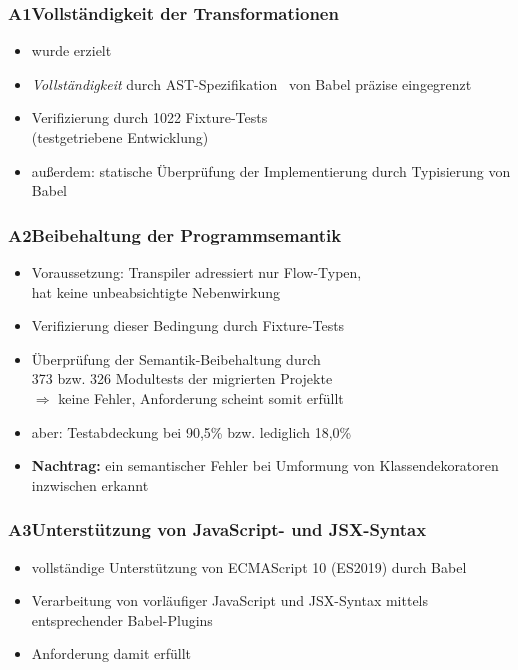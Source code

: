       \begin{frame}
        \frametitle{A1\hspace{0.75em}Vollständigkeit der Transformationen}
        \begin{itemize}
          \item wurde erzielt
          \item \textit{Vollständigkeit} durch AST-Spezifikation~\autocite{BABEL:PARSER_SPEC} von Babel präzise eingegrenzt
          \item Verifizierung durch 1022 Fixture-Tests\\(testgetriebene Entwicklung)
          \item außerdem: statische Überprüfung der Implementierung durch Typisierung von Babel
        \end{itemize}
      \end{frame}

      \begin{frame}
        \frametitle{A2\hspace{0.75em}Beibehaltung der Programmsemantik}
          \begin{itemize}
            \item Voraussetzung: Transpiler adressiert nur Flow-Typen,\\hat keine unbeabsichtigte Nebenwirkung
            \item Verifizierung dieser Bedingung durch Fixture-Tests
            \item Überprüfung der Semantik-Beibehaltung durch\\373 bzw. 326 Modultests der migrierten Projekte\\
              \smallskip
              $\Rightarrow$ keine Fehler, Anforderung scheint somit erfüllt
            \item aber: Testabdeckung bei 90,5\% bzw. lediglich 18,0\%
            \item \textbf{Nachtrag:} ein semantischer Fehler bei Umformung von Klassendekoratoren inzwischen erkannt
          \end{itemize}
      \end{frame}

      \begin{frame}
        \frametitle{A3\hspace{0.75em}Unterstützung von JavaScript- und JSX-Syntax}
        \begin{itemize}
          \item vollständige Unterstützung von ECMAScript 10 (ES2019) durch Babel
          \item Verarbeitung von vorläufiger JavaScript und JSX-Syntax mittels entsprechender Babel-Plugins
          \item Anforderung damit erfüllt
        \end{itemize}
      \end{frame}

